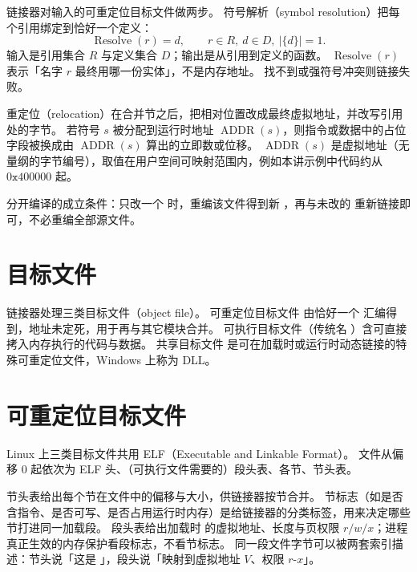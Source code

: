 链接器对输入的可重定位目标文件做两步。
符号解析（symbol resolution）把每个引用绑定到恰好一个定义：
\[
\operatorname{Resolve}(r)=d,
\qquad
r\in R,\ d\in D,\ |\{d\}|=1.
\]
输入是引用集合 $R$ 与定义集合 $D$；输出是从引用到定义的函数。
$\operatorname{Resolve}(r)$ 表示「名字 $r$ 最终用哪一份实体」，不是内存地址。
找不到或强符号冲突则链接失败。

重定位（relocation）在合并节之后，把相对位置改成最终虚拟地址，并改写引用处的字节。
若符号 $s$ 被分配到运行时地址 $\operatorname{ADDR}(s)$，则指令或数据中的占位字段被换成由 $\operatorname{ADDR}(s)$ 算出的立即数或位移。
$\operatorname{ADDR}(s)$ 是虚拟地址（无量纲的字节编号），取值在用户空间可映射范围内，例如本讲示例中代码约从 $0\texttt{x}400000$ 起。

分开编译的成立条件：只改一个  时，重编该文件得到新 ，再与未改的  重新链接即可，不必重编全部源文件。

\section{目标文件}

链接器处理三类目标文件（object file）。
可重定位目标文件  由恰好一个  汇编得到，地址未定死，用于再与其它模块合并。
可执行目标文件（传统名 ）含可直接拷入内存执行的代码与数据。
共享目标文件  是可在加载时或运行时动态链接的特殊可重定位文件，Windows 上称为 DLL。

\section{可重定位目标文件}



Linux 上三类目标文件共用 ELF（Executable and Linkable Format）。
文件从偏移 $0$ 起依次为 ELF 头、（可执行文件需要的）段头表、各节、节头表。

节头表给出每个节在文件中的偏移与大小，供链接器按节合并。
节标志（如是否含指令、是否可写、是否占用运行时内存）是给链接器的分类标签，用来决定哪些节打进同一加载段。
段头表给出加载时  的虚拟地址、长度与页权限 $r/w/x$；进程真正生效的内存保护看段标志，不看节标志。
同一段文件字节可以被两套索引描述：节头说「这是 」，段头说「映射到虚拟地址 $V$、权限 $r$-$x$」。

